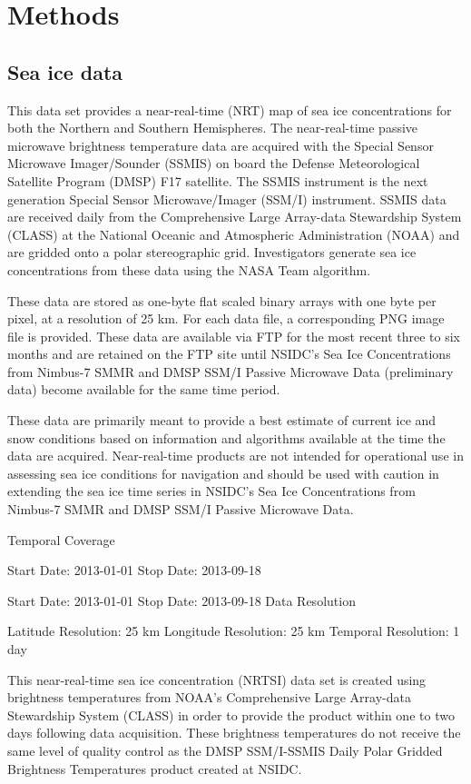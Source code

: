 \section{Methods}

\subsection{Sea ice data}

This data set provides a near-real-time (NRT) map of sea ice concentrations for both the Northern and Southern Hemispheres. The near-real-time passive microwave brightness temperature data are acquired with the Special Sensor Microwave Imager/Sounder (SSMIS) on board the Defense Meteorological Satellite Program (DMSP) F17 satellite. The SSMIS instrument is the next generation Special Sensor Microwave/Imager (SSM/I) instrument. SSMIS data are received daily from the Comprehensive Large Array-data Stewardship System (CLASS) at the National Oceanic and Atmospheric Administration (NOAA) and are gridded onto a polar stereographic grid. Investigators generate sea ice concentrations from these data using the NASA Team algorithm.

These data are stored as one-byte flat scaled binary arrays with one byte per pixel, at a resolution of 25 km. For each data file, a corresponding PNG image file is provided. These data are available via FTP for the most recent three to six months and are retained on the FTP site until NSIDC's Sea Ice Concentrations from Nimbus-7 SMMR and DMSP SSM/I Passive Microwave Data (preliminary data) become available for the same time period.

These data are primarily meant to provide a best estimate of current ice and snow conditions based on information and algorithms available at the time the data are acquired. Near-real-time products are not intended for operational use in assessing sea ice conditions for navigation and should be used with caution in extending the sea ice time series in NSIDC's Sea Ice Concentrations from Nimbus-7 SMMR and DMSP SSM/I Passive Microwave Data.

Temporal Coverage

Start Date: 2013-01-01
Stop Date: 2013-09-18

Start Date: 2013-01-01
Stop Date: 2013-09-18
Data Resolution

Latitude Resolution: 25 km
Longitude Resolution: 25 km
Temporal Resolution: 1 day




This near-real-time sea ice concentration (NRTSI) data set is created using brightness temperatures from NOAA's Comprehensive Large Array-data Stewardship System (CLASS) in order to provide the product within one to two days following data acquisition. These brightness temperatures do not receive the same level of quality control as the DMSP SSM/I-SSMIS Daily Polar Gridded Brightness Temperatures product created at NSIDC.

